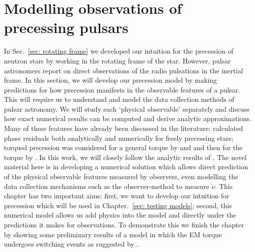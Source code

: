 \documentclass[../full_thesis/full_thesis.tex]{subfiles}
\begin{document}
\chapter{Modelling observations of precessing pulsars}

In Sec.~\ref{sec: rotating frame} we developed our intuition for the precession
of neutron stars by working in the rotating frame of the star. However, pulsar
astronomers report on direct observations of the radio pulsations in the
inertial frame. In this section, we will develop our precession model by making
predictions for how precession manifests in the observable features of a
pulsar. This will require us to understand and model the data collection
methods of pulsar astronomy. We will study each `physical observable'
separately and discuss how exact numerical results can be computed and derive
analytic approximations. Many of these features have already been discussed in
the literature: \citet{Nelson1990} calculated phase residuals both analytically
and numerically for freely precessing stars; torqued precession was considered
for a general torque by \citet{Jones1988excitation} and \citet{Cordes1993} and
then for the \citet{Deutsch1955} torque by \citet{Melatos1999}. In this work,
we will closely follow the analytic results of \citet{Jones2001}. The novel
material here is in developing a numerical solution which allows direct
prediction of the physical observable features measured by observers, even
modelling the data collection mechanisms such as the observer-method to measure
$\dot{\nu}$. This chapter has two important aims: first, we want to develop our
intuition for precession which will be used in Chapter.~\ref{sec: testing
models}; second, this numerical model allows us add physics into the model and
directly under the predictions it makes for observations. To demonstrate this
we finish the chapter by showing some preliminary results of a model in which
the EM torque undergoes switching events as suggested by \citet{Lyne2010}.
\end{document}
